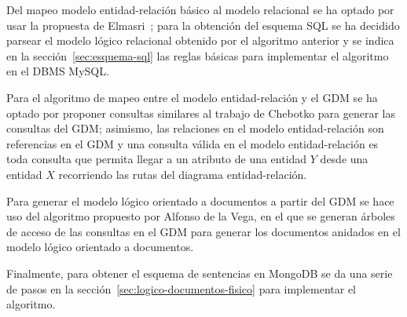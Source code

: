 Del mapeo modelo entidad-relación básico al modelo relacional se ha optado por usar la propuesta de Elmasri~\cite{ramez_elmasri_fundamentos_nodate}; para la obtención del esquema SQL se ha decidido parsear el modelo lógico relacional obtenido por el algoritmo anterior y se indica en la sección~\ref{sec:esquema-sql} las reglas básicas para implementar el algoritmo en el DBMS MySQL.


Para el algoritmo de mapeo entre el modelo entidad-relación y el GDM se ha optado por proponer consultas similares al trabajo de Chebotko\cite{chebotko_big_2015} para generar las consultas del GDM; asimismo, las relaciones en el modelo entidad-relación son referencias en el GDM y una consulta válida en el modelo entidad-relación es toda consulta que permita llegar a un atributo de una entidad $Y$ desde una entidad $X$ recorriendo las rutas del diagrama entidad-relación.


Para generar el modelo lógico orientado a documentos a partir del GDM se hace uso del algoritmo propuesto por Alfonso de la Vega, en el que se generan árboles de acceso de las consultas en el GDM para generar los documentos anidados en el modelo lógico orientado a documentos.


Finalmente, para obtener el esquema de sentencias en MongoDB se da una serie de pasos en la sección~\ref{sec:logico-documentos-fisico} para implementar el algoritmo.